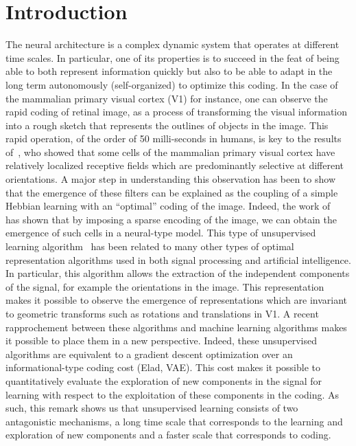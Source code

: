 \documentclass[a4paper, 11pt, draft]{article} %
\title{\Title}
\author{%
\FirstNameA\ \AuthorA \and \FirstNameB\ \AuthorB \and \FirstNameC\ \AuthorC
}
\date{\Institute\ \\ 
\Organism\
}
\newcommand{\Abstract}{
The formation of structure in the brain, that is, of the connection between cells within neural populations, is by large an unsupervised learning process: The emergence of this architecture is mostly self-organized. In the primary visual cortex of mammals, for example, one may observe during development the emergence of cells selective to localized, oriented features. This leads to the development of a rough representation of contours of the retinal image in area V1. A major difficulty in defining unsupervised learning algorithms is that during this process, on the one hand the coding is performed knowing an immature structure and on the other hand, the adaptation of this structure is carried out knowing a code that is not yet optimal. We propose here a fast algorithm compatible with a neuromimetic architecture which solves this problem and allows for the fast emergence of localized filters sensitive to orientation. The key to this algorithm lies in a simple yet optimal mechanism of homeostasis that reconciles the antagonistic processes that occur at the coding and learning time scales. We tested this unsupervised algorithm with this homeostasis rule for a range of existing unsupervised learning algorithms coupled with different neural coding algorithms. In addition, we propose a simplification of this optimal homeostasis rule by implementing a simple heuristic on the probability of activation of neurones. Compared to the optimal homeostasis rule, we show that this heuristic allows to implement an even faster unsupervised learning algorithm while keeping a large part of its effectiveness. These results demonstrate the potential application of such a strategy to the fast classification of images, for example in hierarchical and dynamic architectures.
}
\begin{document}
%
\maketitle
\begin{abstract}
\Abstract
\end{abstract}
\thispagestyle{empty}
\section{Introduction}\label{introduction}
The neural architecture is a complex dynamic system that operates at different time scales. In particular, one of its properties is to succeed in the feat of being able to both represent information quickly but also to be able to adapt in the long term autonomously (self-organized) to optimize this coding. In the case of the mammalian primary visual cortex (V1) for instance, one can observe the rapid coding of retinal image, as a process of transforming the visual information into a rough sketch that represents the outlines of objects in the image. This rapid operation, of the order of 50 milli-seconds in humans, is key to the results of~\textcite{hubel1968receptive}, who showed that some cells of the mammalian primary visual cortex have relatively localized receptive fields which are predominantly selective at different orientations. A major step in understanding this observation has been to show that the emergence of these filters can be explained as the coupling of a simple Hebbian learning with an ``optimal'' coding of the image. Indeed, the work of~\textcite{olshausen1996emergence} has shown that by imposing a sparse encoding of the image, we can obtain the emergence of such cells in a neural-type model. This type of unsupervised learning algorithm~\citep{Olshausen97} has been related to many other types of optimal representation algorithms used in both signal processing and artificial intelligence. In particular, this algorithm allows the extraction of the independent components of the signal, for example the orientations in the image. This representation makes it possible to observe the emergence of representations which are invariant to geometric transforms such as rotations and translations in V1. A recent rapprochement between these algorithms and machine learning algorithms makes it possible to place them in a new perspective. Indeed, these unsupervised algorithms are equivalent to a gradient descent optimization over an informational-type coding cost (Elad, VAE). This cost makes it possible to quantitatively evaluate the exploration of new components in the signal for learning with respect to the exploitation of these components in the coding. As such, this remark shows us that unsupervised learning consists of two antagonistic mechanisms, a long time scale that corresponds to the learning and exploration of new components and a faster scale that corresponds to coding.
\end{document}
